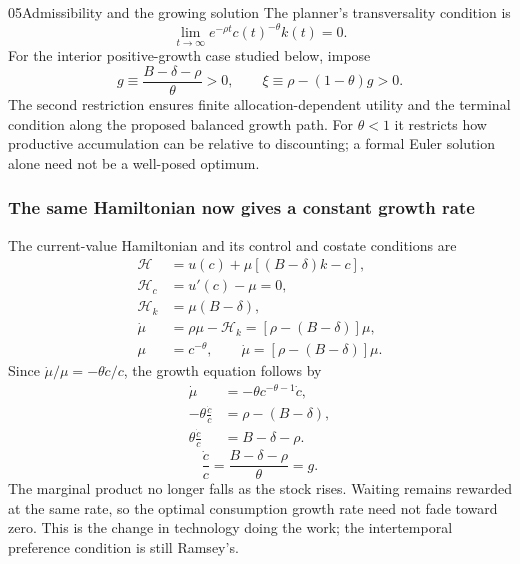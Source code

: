 \begin{modelsetup}[1]
\begin{modelcondition}{05}{Admissibility and the growing solution}
The planner's transversality condition is
\[
\lim_{t\to\infty}e^{-\rho t}c(t)^{-\theta}k(t)=0.
\]
For the interior positive-growth case studied below, impose
\[
g\equiv\frac{B-\delta-\rho}{\theta}>0,\qquad
\xi\equiv\rho-(1-\theta)g>0.
\]
The second restriction ensures finite allocation-dependent utility and the
terminal condition along the proposed balanced growth path. For $\theta<1$
it restricts how productive accumulation can be relative to discounting;
a formal Euler solution alone need not be a well-posed optimum.
\end{modelcondition}
\end{modelsetup}

\subsubsection{The same Hamiltonian now gives a constant growth rate}

The current-value Hamiltonian and its control and costate conditions are
\begin{align}
\mathcal H&=u(c)+\mu[(B-\delta)k-c],\\
\mathcal H_c&=u'(c)-\mu=0,\\
\mathcal H_k&=\mu(B-\delta),\\
\dot\mu&=\rho\mu-\mathcal H_k=[\rho-(B-\delta)]\mu,\\
\mu&=c^{-\theta},\qquad
\dot\mu=[\rho-(B-\delta)]\mu.
\end{align}
Since $\dot\mu/\mu=-\theta\dot c/c$,
the growth equation follows by
\begin{align}
\dot\mu&=-\theta c^{-\theta-1}\dot c,\\
-\theta\frac{\dot c}{c}&=\rho-(B-\delta),\\
\theta\frac{\dot c}{c}&=B-\delta-\rho.
\end{align}
\begin{equation}\label{eq:eg-ak-growth}
\frac{\dot c}{c}=\frac{B-\delta-\rho}{\theta}=g.
\end{equation}
The marginal product no longer falls as the stock rises. Waiting remains
rewarded at the same rate, so the optimal consumption growth rate need not
fade toward zero. This is the change in technology doing the work; the
intertemporal preference condition is still Ramsey's.

